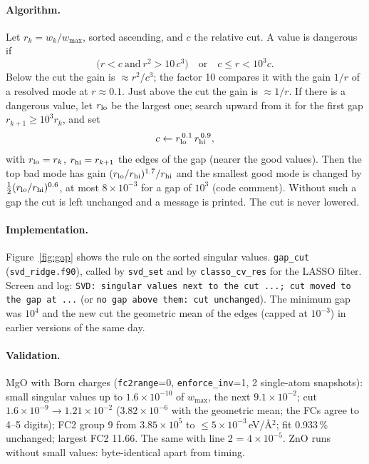 \documentclass[11pt,a4paper]{article}
\newcommand{\code}[1]{\texttt{#1}}
\begin{document}
\paragraph{Algorithm.} Let $r_k=w_k/w_{\max}$, sorted ascending, and $c$ the relative cut. A value is
dangerous if
\begin{equation}
\big(r<c\ \text{and}\ r^2>10\,c^3\big)\quad\text{or}\quad c\le r<10^3c .
\end{equation}
Below the cut the gain is $\approx r^2/c^3$; the factor 10 compares it with the gain $1/r$ of a resolved mode
at $r\approx0.1$. Just above the cut the gain is $\approx1/r$. If there is a dangerous value, let $r_{\rm lo}$ be
the largest one; search upward from it for the first gap $r_{k+1}\ge10^3r_k$, and set
\begin{equation}
c\leftarrow r_{\rm lo}^{\,0.1}\,r_{\rm hi}^{\,0.9},
\end{equation}
with $r_{\rm lo}=r_k$, $r_{\rm hi}=r_{k+1}$ the edges of the gap (nearer the good values). Then the top bad mode
has gain $(r_{\rm lo}/r_{\rm hi})^{1.7}/r_{\rm hi}$ and the smallest good mode is changed by
$\tfrac12(r_{\rm lo}/r_{\rm hi})^{0.6}$, at most $8\times10^{-3}$ for a gap of $10^3$ (code comment). Without such a
gap the cut is left unchanged and a message is printed. The cut is never lowered.

\paragraph{Implementation.} Figure~\ref{fig:gap} shows the rule on the sorted singular values.
\code{gap\_cut} (\code{svd\_ridge.f90}), called by \code{svd\_set} and by
\code{classo\_cv\_res} for the LASSO filter. Screen and log: \code{SVD: singular values next to the cut ...;
cut moved to the gap at ...} (or \code{no gap above them: cut unchanged}). The minimum gap was $10^4$ and the new cut the geometric mean of the edges (capped at
$10^{-3}$) in earlier versions of the same day.

\paragraph{Validation.} MgO with Born charges (\code{fc2range}=0, \code{enforce\_inv}=1, 2 single-atom
snapshots): small singular values up to $1.6\times10^{-10}$ of $w_{\max}$, the next $9.1\times10^{-2}$; cut
$1.6\times10^{-9}\to1.21\times10^{-2}$ ($3.82\times10^{-6}$ with the geometric mean; the FCs agree to 4--5 digits); FC2
group 9 from $3.85\times10^5$ to $\le5\times10^{-3}$\,eV/\AA$^2$; fit 0.933\,\% unchanged; largest FC2 11.66. The same
with line 2 = $4\times10^{-5}$. ZnO runs without small values: byte-identical apart from timing.
\end{document}

